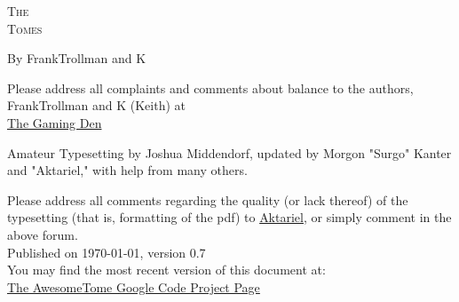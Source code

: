 \pagestyle{plain}

\begin{center} \Huge

\textsc{The\\
Tomes\\
}\end{center}



\vspace{2cm}
\begin{center}\large By FrankTrollman and K\end{center}


\newpage

\vspace*{4in}

\noindent Please address all complaints and comments about balance to the authors, FrankTrollman and K (Keith) at\\
{\color{blue} \href{http://tgdmb.com/viewforum.php?f=1}{The Gaming Den}}

\vspace{0.2in}



\noindent Amateur Typesetting by Joshua Middendorf, updated by Morgon "Surgo" Kanter and "Aktariel," with help from many others.\\

\vspace{0.15in}

\noindent Please address all comments regarding the quality (or lack thereof) of the typesetting (that is, formatting of the pdf) to \href{mailto:aktariel@gmail.com}{Aktariel}, or simply comment in the above forum.\\





\vspace{1in}
\noindent Published on \today, version 0.7\\
\noindent You may find the most recent version of this document at:\\
{\color{blue} \href{http://code.google.com/p/awesometome/downloads/list}{The AwesomeTome Google Code Project Page}}

\newpage
